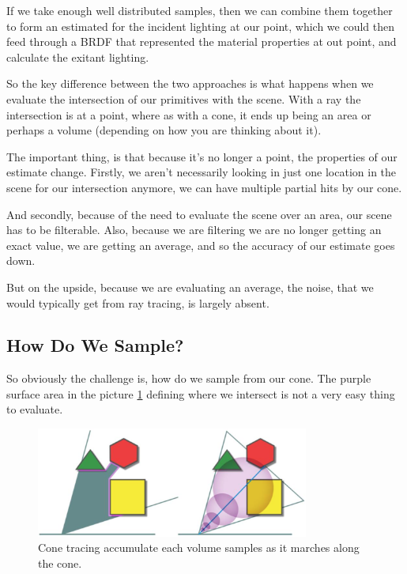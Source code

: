 If we take enough well distributed samples, then we can combine them together to form an estimated for the incident lighting at our point, which we could then feed through a BRDF that represented the material properties at out point, and calculate the exitant lighting.

So the key difference between the two approaches is what happens when we evaluate the intersection of our primitives with the scene. With a ray the intersection is at a point, where as with a cone, it ends up being an area or perhaps a volume (depending on how you are thinking about it).

The important thing, is that because it's no longer a point, the properties of our estimate change. Firstly, we aren't necessarily looking in just one location in the scene for our intersection anymore, we can have multiple partial hits by our cone.

And secondly, because of the need to evaluate the scene over an area, our scene has to be filterable. Also, because we are filtering we are no longer getting an exact value, we are getting an average, and so the accuracy of our estimate goes down.

But on the upside, because we are evaluating an average, the noise, that we would typically get from ray tracing, is largely absent.



\subsection{How Do We Sample?}
So obviously the challenge is, how do we sample from our cone. The purple surface area in the picture \ref{f:cone-sample} defining where we intersect is not a very easy thing to evaluate. 

\begin{figure}\label{f:cone-sample}
	\begin{center}
		\includegraphics[width=0.8\textwidth]{graphics/vct/vct-2-2}
	\end{center}
	\caption{Cone tracing accumulate each volume samples as it marches along the cone.}
\end{figure}

